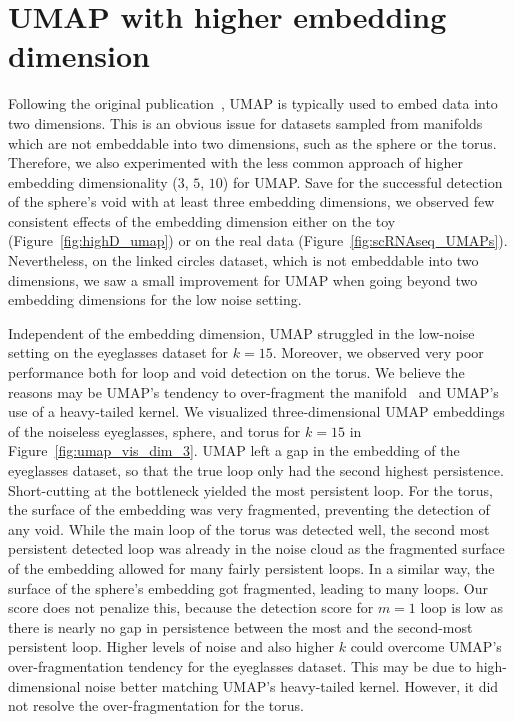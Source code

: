 \documentclass{article}
\theoremstyle{plain}
\theoremstyle{definition}
\theoremstyle{remark}
\begin{document}
\section{UMAP with higher embedding dimension}
\label{sec:umap_high_embd_dim}
Following the original publication~\citep{mcinnes2018umap}, UMAP is typically used to embed data into two dimensions. This is an obvious issue for datasets sampled from manifolds which are not embeddable into two dimensions, such as the sphere or the torus. Therefore, we also experimented with the less common approach of higher embedding dimensionality ($3$, $5$, $10$) for UMAP. Save for the successful detection of the sphere's void with at least three embedding dimensions, we observed few consistent effects of the embedding dimension either on the toy (Figure~\ref{fig:highD_umap}) or on the real data (Figure~\ref{fig:scRNAseq_UMAPs}). Nevertheless, on the linked circles dataset, which is not embeddable into two dimensions, we saw a small improvement for UMAP when going beyond two embedding dimensions for the low noise setting.

Independent of the embedding dimension, UMAP struggled in the low-noise setting on the eyeglasses dataset for $k=15$. Moreover, we observed very poor performance both for loop and void detection on the torus. We believe the reasons may be UMAP's tendency to over-fragment the manifold~\citep{damrich2021umap} and UMAP's use of a heavy-tailed kernel. We visualized three-dimensional UMAP embeddings of the noiseless eyeglasses, sphere, and torus for $k=15$ in Figure~\ref{fig:umap_vis_dim_3}. UMAP left a gap in the embedding of the eyeglasses dataset, so that the true loop only had the second highest persistence. Short-cutting at the bottleneck yielded the most persistent loop. For the torus, the surface of the embedding was very fragmented, preventing the detection of any void. While the main loop of the torus was detected well, the second most persistent detected loop was already in the noise cloud as the fragmented surface of the embedding allowed for many fairly persistent loops. In a similar way, the surface of the sphere's embedding got fragmented, leading to many loops. Our score does not penalize this, because the detection score for $m=1$ loop is low as there is nearly no gap in persistence between the most and the second-most persistent loop. Higher levels of noise and also higher $k$ could overcome UMAP's over-fragmentation tendency for the eyeglasses dataset. This may be due to high-dimensional noise better matching UMAP's heavy-tailed kernel. However, it did not resolve the over-fragmentation  for the torus. 
\end{document}
